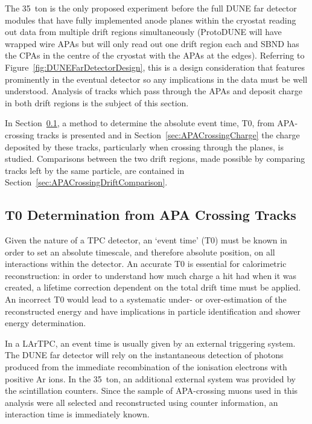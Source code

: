 The 35~ton is the only proposed experiment before the full DUNE far detector modules that have fully implemented anode planes within the cryostat reading out data from multiple drift regions simultaneously (ProtoDUNE will have wrapped wire APAs but will only read out one drift region each and SBND has the CPAs in the centre of the cryostat with the APAs at the edges).  Referring to Figure~\ref{fig:DUNEFarDetectorDesign}, this is a design consideration that features prominently in the eventual detector so any implications in the data must be well understood.  Analysis of tracks which pass through the APAs and deposit charge in both drift regions is the subject of this section.

In Section~\ref{sec:APACrossingT0}, a method to determine the absolute event time, T0, from APA-crossing tracks is presented and in Section~\ref{sec:APACrossingCharge} the charge deposited by these tracks, particularly when crossing through the planes, is studied.  Comparisons between the two drift regions, made possible by comparing tracks left by the same particle, are contained in Section~\ref{sec:APACrossingDriftComparison}.

\subsection{T0 Determination from APA Crossing Tracks}\label{sec:APACrossingT0}

Given the nature of a TPC detector, an `event time' (T0) must be known in order to set an absolute timescale, and therefore absolute position, on all interactions within the detector.  An accurate T0 is essential for calorimetric reconstruction: in order to understand how much charge a hit had when it was created, a lifetime correction dependent on the total drift time must be applied.  An incorrect T0 would lead to a systematic under- or over-estimation of the reconstructed energy and have implications in particle identification and shower energy determination.

In a LArTPC, an event time is usually given by an external triggering system.  The DUNE far detector will rely on the instantaneous detection of photons produced from the immediate recombination of the ionisation electrons with positive Ar ions.  In the 35~ton, an additional external system was provided by the scintillation counters.  Since the sample of APA-crossing muons used in this analysis were all selected and reconstructed using counter information, an interaction time is immediately known.

